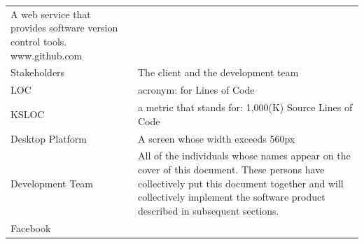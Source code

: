 \documentclass[]{article}
\begin{document}
\begin{longtable}[c]{@{}ll@{}}
\begin{minipage}[t]{0.47\columnwidth}
A web service that provides software version control tools.
www.github.com
\end{minipage}
\\\addlinespace
\begin{minipage}[t]{0.47\columnwidth}\raggedright
Stakeholders
\end{minipage} & \begin{minipage}[t]{0.47\columnwidth}\raggedright
The client and the development team
\end{minipage}
\\\addlinespace
\begin{minipage}[t]{0.47\columnwidth}\raggedright
LOC
\end{minipage} & \begin{minipage}[t]{0.47\columnwidth}\raggedright
acronym: for Lines of Code
\end{minipage}
\\\addlinespace
\begin{minipage}[t]{0.47\columnwidth}\raggedright
KSLOC
\end{minipage} & \begin{minipage}[t]{0.47\columnwidth}\raggedright
a metric that stands for: 1,000(K) Source Lines of Code
\end{minipage}
\\\addlinespace
\begin{minipage}[t]{0.47\columnwidth}\raggedright
Desktop Platform
\end{minipage} & \begin{minipage}[t]{0.47\columnwidth}\raggedright
A screen whose width exceeds 560px
\end{minipage}
\\\addlinespace
\begin{minipage}[t]{0.47\columnwidth}\raggedright
Development Team
\end{minipage} & \begin{minipage}[t]{0.47\columnwidth}\raggedright
All of the individuals whose names appear on the cover of this document.
These persons have collectively put this document together and will
collectively implement the software product described in subsequent
sections.
\end{minipage}
\\\addlinespace
\begin{minipage}[t]{0.47\columnwidth}\raggedright
Facebook
\end{minipage} & \begin{minipage}[t]{0.47\columnwidth}\raggedright

\end{minipage}
\end{longtable}
\end{document}
